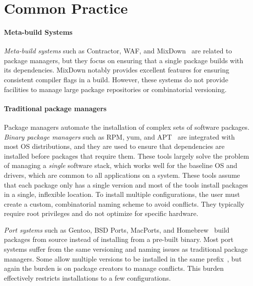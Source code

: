 
\section{Common Practice}
\label{sec:motivation}

\paragraph{Meta-build Systems}
{\it Meta-build systems} such as Contractor, WAF, and
MixDown~\cite{amundson:contractor,epperly+:mixdown,epperly+:mixdown-report,nagy:waf} are
related to package managers, but they focus on ensuring that a single
package builds with its dependencies.  MixDown notably provides excellent
features for ensuring consistent compiler flags in a build.
However, these systems do not provide facilities to manage
large package repositories or combinatorial versioning.

\paragraph{Traditional package managers}
Package managers automate the installation of complex sets of software packages.
{\it Binary package managers} such as RPM, yum, and
APT~\cite{foster+:rpm03,silva:apt01,yum} are integrated with most
OS distributions, and they are used to ensure that dependencies
are installed before packages that require them.
These tools largely solve the problem of managing a {\it single} software
stack, which works well for the baseline OS and drivers, which are
common to all applications on a system.
These tools assume that each package only has a single version
and most of the tools install packages in a single, inflexible location.
To install multiple configurations, the user must create a custom, combinatorial
naming scheme to avoid conflicts. They typically require root
privileges and do not optimize for specific hardware.

{\it Port systems} such as Gentoo, BSD Ports, MacPorts, and
Homebrew~\cite{bsdports,groffen:gentoo-prefix,homebrew,macports,thiruvathukal:gentoo04}
build packages from source instead of installing from a pre-built binary.
Most port systems suffer from
the same versioning and naming issues as traditional package managers.
Some allow multiple versions to be installed in the same
prefix~\cite{groffen:gentoo-prefix}, but again the burden is on package
creators to manage conflicts. This burden effectively restricts installations
to a few configurations.


